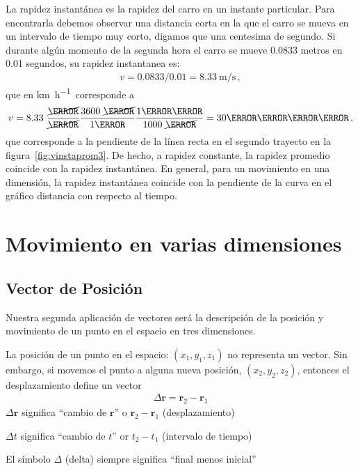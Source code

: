 La rapidez instantánea es la rapidez del carro en un instante particular. Para encontrarla debemos observar una distancia corta en la que el carro se mueva en un intervalo de tiempo muy corto, digamos que una centesima de segundo. Si durante algún momento de la segunda hora el carro se mueve 0.0833 metros en 0.01 segundos, su rapidez instantanea es:
\begin{align}
  v=0.0833/0.01=\SI{8.33}{\meter\per\second} \,,
\end{align}
que en \si{\kilo\meter\per\hour}\ corresponde a
\begin{align}
  v=8.33\ \frac{\cancel{\si{\meter}}}{\cancel{\si{\second}}}\frac{3600\ \cancel{\si{\second}}}{\SI{1}{\hour}}\frac{\SI{1}{\kilo\meter}}{1000\ \cancel{\si{\meter}}}=\SI{30}{\kilo\meter\per\hour}\,.
\end{align}
que corresponde a la pendiente de la línea recta en el segundo
trayecto en la figura~\ref{fig:vinstaprom3}. De hecho, a rapidez
constante, la rapidez promedio coincide con la rapidez instantánea. En
general, para un movimiento en una dimensión, la rapidez instantánea
coincide con la pendiente de la curva en el gráfico distancia con
respecto al tiempo.

\section{Movimiento en varias dimensiones}

\subsection{Vector de Posición}
Nuestra segunda aplicaci\'on de vectores ser\'a la descripci\'on  de la posici\'on y movimiento de un punto en el espacio en tres dimensiones. 

La posici\'on de un punto en el espacio: $(x_1,y_1,z_1)$ no representa un vector. Sin embargo, si movemos el punto a alguna nueva posici\'on, $(x_2,y_2,z_2)$, entonces el desplazamiento define un vector 
\begin{align}
  \Delta \mathbf{r}=\mathbf{r}_2-\mathbf{r}_1
\end{align}
$\Delta\mathbf{r}$ significa ``cambio de $\mathbf{r}$'' o $\mathbf{r}_2-\mathbf{r}_1$ (desplazamiento)

$\Delta t$ significa ``cambio de $t$'' or $t_2-t_1$ (intervalo de tiempo)

El símbolo $\Delta$ (delta) siempre significa ``final menos inicial''

